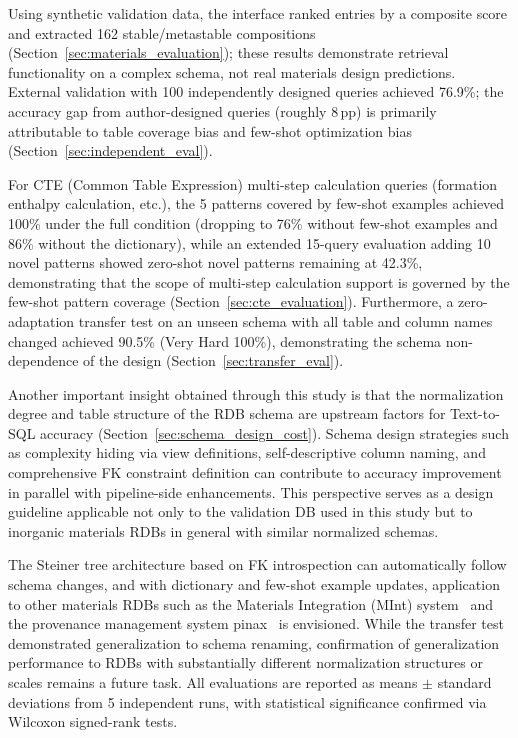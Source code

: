 \documentclass{npj-compt.mater}
\begin{document}
Using synthetic validation data, the interface ranked entries
by a composite score and extracted 162 stable/metastable
compositions (Section~\ref{sec:materials_evaluation}); these
results demonstrate retrieval functionality on a complex schema,
not real materials design predictions.
External validation with 100 independently designed queries
achieved 76.9\%; the accuracy gap from author-designed queries
(roughly 8\,pp) is primarily attributable to table coverage bias
and few-shot optimization bias
(Section~\ref{sec:independent_eval}).

For CTE (Common Table Expression) multi-step calculation queries
(formation enthalpy calculation, etc.), the 5 patterns covered by
few-shot examples achieved 100\% under the full condition
(dropping to 76\% without few-shot examples and 86\% without the
dictionary), while an extended 15-query evaluation adding 10 novel
patterns showed zero-shot novel patterns remaining at 42.3\%,
demonstrating that the scope of multi-step calculation support is
governed by the few-shot pattern coverage
(Section~\ref{sec:cte_evaluation}).
Furthermore, a zero-adaptation transfer test on an unseen schema
with all table and column names changed achieved 90.5\%
(Very Hard 100\%), demonstrating the schema non-dependence of the
design (Section~\ref{sec:transfer_eval}).

Another important insight obtained through this study is that the
normalization degree and table structure of the RDB schema are
upstream factors for Text-to-SQL accuracy
(Section~\ref{sec:schema_design_cost}).
Schema design strategies such as complexity hiding via view
definitions, self-descriptive column naming, and comprehensive FK
constraint definition can contribute to accuracy improvement in
parallel with pipeline-side enhancements.
This perspective serves as a design guideline applicable not only
to the validation DB used in this study but to inorganic materials
RDBs in general with similar normalized schemas.

The Steiner tree architecture based on FK introspection can
automatically follow schema changes, and with dictionary and
few-shot example updates, application to other materials RDBs
such as the Materials Integration (MInt) system~\cite{minamoto2020mint}
and the provenance management system
pinax~\cite{minamoto2026pinax} is envisioned.
While the transfer test demonstrated generalization to schema
renaming, confirmation of generalization performance to RDBs with
substantially different normalization structures or scales remains
a future task.
All evaluations are reported as means $\pm$ standard deviations
from 5 independent runs, with statistical significance confirmed
via Wilcoxon signed-rank tests.
\end{document}
